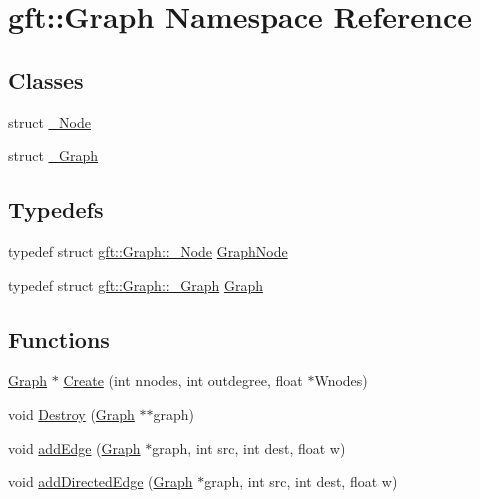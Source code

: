 \hypertarget{namespacegft_1_1Graph}{\section{gft\-:\-:Graph Namespace Reference}
\label{namespacegft_1_1Graph}
}
\subsection*{Classes}
\begin{DoxyCompactItemize}
\item 
struct \hyperlink{structgft_1_1Graph_1_1__Node}{\-\_\-\-Node}
\item 
struct \hyperlink{structgft_1_1Graph_1_1__Graph}{\-\_\-\-Graph}
\end{DoxyCompactItemize}
\subsection*{Typedefs}
\begin{DoxyCompactItemize}
\item 
typedef struct \hyperlink{structgft_1_1Graph_1_1__Node}{gft\-::\-Graph\-::\-\_\-\-Node} \hyperlink{namespacegft_1_1Graph_a86c9c9e21a6c7f4770150ec13209cd89}{Graph\-Node}
\item 
typedef struct \hyperlink{structgft_1_1Graph_1_1__Graph}{gft\-::\-Graph\-::\-\_\-\-Graph} \hyperlink{namespacegft_1_1Graph_a95acabdf6e7f5b884255558bef5d3f8b}{Graph}
\end{DoxyCompactItemize}
\subsection*{Functions}
\begin{DoxyCompactItemize}
\item 
\hyperlink{namespacegft_1_1Graph_a95acabdf6e7f5b884255558bef5d3f8b}{Graph} $\ast$ \hyperlink{namespacegft_1_1Graph_ab976f11dedd1b0388a6997b8ed85d729}{Create} (int nnodes, int outdegree, float $\ast$Wnodes)
\item 
void \hyperlink{namespacegft_1_1Graph_a3750ee0b435a7b8e237ae947c291c6c0}{Destroy} (\hyperlink{namespacegft_1_1Graph_a95acabdf6e7f5b884255558bef5d3f8b}{Graph} $\ast$$\ast$graph)
\item 
void \hyperlink{namespacegft_1_1Graph_a40d830adee3798449005f923120f5fdb}{add\-Edge} (\hyperlink{namespacegft_1_1Graph_a95acabdf6e7f5b884255558bef5d3f8b}{Graph} $\ast$graph, int src, int dest, float w)
\item 
void \hyperlink{namespacegft_1_1Graph_a44d425a3196b95a27bd2c5ed8f54322c}{add\-Directed\-Edge} (\hyperlink{namespacegft_1_1Graph_a95acabdf6e7f5b884255558bef5d3f8b}{Graph} $\ast$graph, int src, int dest, float w)
\end{DoxyCompactItemize}



